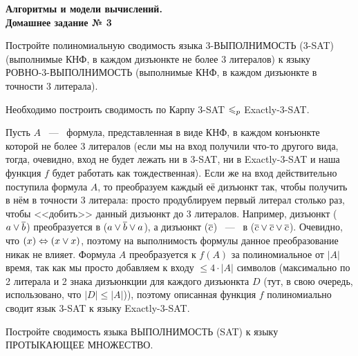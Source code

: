 \documentclass[a4paper,12pt]{article}
\begin{document}
	
	\thispagestyle{firstpage}
	
	\begin{center}
		\textbf{\Large{Алгоритмы и модели вычислений. \\ Домашнее задание № 3}}
	\end{center}
	
\begin{tasknum}{1}
	Постройте полиномиальную сводимость языка 3-ВЫПОЛНИМОСТЬ (3-SAT) (выполнимые КНФ, в каждом дизъюнкте не более 3 литералов) к языку РОВНО-3-ВЫПОЛНИМОСТЬ (выполнимые КНФ, в каждом дизъюнкте в точности $3$ литерала).
\end{tasknum}

\begin{solution}
	
	Необходимо построить сводимость по Карпу 3-SAT $\leqslant_p$ Exactly-3-SAT. 
	
	Пусть $A$ ~---~ формула, представленная в виде КНФ, в каждом конъюнкте которой не более 3 литералов (если мы на вход получили что-то другого вида, тогда, очевидно, вход не будет лежать ни в 3-SAT, ни в Exactly-3-SAT и наша функция $f$ будет работать как тождественная). Если же на вход действительно поступила формула $A$, то преобразуем каждый её дизъюнкт так, чтобы получить в нём в точности $3$ литерала: просто продублируем первый литерал столько раз, чтобы <<добить>> данный дизъюнкт до 3 литералов. Например, дизъюнкт ($a \vee \overline{b}$) преобразуется в ($a \vee \overline{b} \vee a$), а дизъюнкт ($\overline{c}$) ~---~ в ($\overline{c} \vee \overline{c} \vee \overline{c}$). Очевидно, что $(x) \Leftrightarrow (x \vee x)$, поэтому на выполнимость формулы данное преобразование никак не влияет. Формула $A$ преобразуется к $f(A)$ за полиномиальное от $|A|$ время, так как мы просто добавляем к входу $\le 4 \cdot |A|$ символов (максимально по 2 литерала и 2 знака дизъюнкции для каждого дизъюнкта $D$ (тут, в свою очередь, использовано, что $|D| \le |A|$)), поэтому описанная функция $f$ полиномиально сводит язык 3-SAT к языку Exactly-3-SAT.
	
\end{solution}

\begin{tasknum}{2}
	Постройте сводимость языка ВЫПОЛНИМОСТЬ (SAT) к языку ПРОТЫКАЮЩЕЕ МНОЖЕСТВО.
\end{tasknum}
\end{document}
